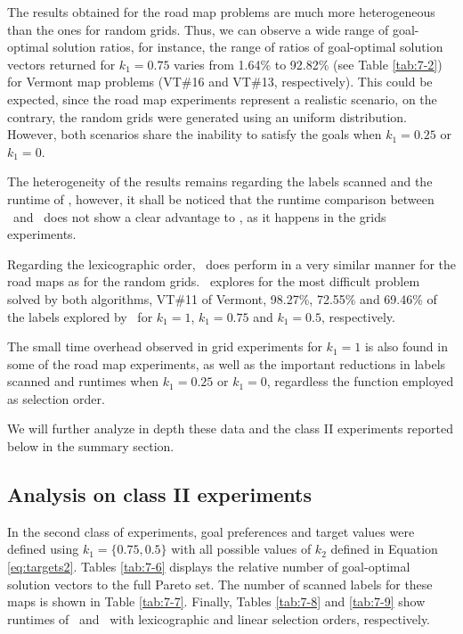 The results obtained for the road map problems are much more heterogeneous than the ones for random grids. Thus, we can observe a wide range of goal-optimal solution ratios, for instance, the range of ratios of goal-optimal solution vectors returned for $k_1 = 0.75$ varies from 1.64\% to 92.82\% (see Table \ref{tab:7-2}) for Vermont map problems (VT\#16 and VT\#13, respectively). This could be expected, since the road map experiments represent a realistic scenario, on the contrary, the random grids were generated using an uniform distribution. However, both scenarios share the inability to satisfy the goals when $k_1 = 0.25$ or $k_1 = 0$.

The heterogeneity of the results remains regarding the labels scanned and the runtime of \lexgo, however, it shall be noticed that the runtime comparison between \namoalex \ and \namoalin \ does not show a clear advantage to \namoalin, as it happens in the grids experiments. 

Regarding the lexicographic order, \lexgo \ does perform in a very similar manner for the road maps as for the random grids. \lexgo \ explores for the most difficult problem solved by both algorithms, VT\#11 of Vermont, 98.27\%, 72.55\% and 69.46\% of the labels explored by \namoa \ for $k_1=1$, $k_1=0.75$ and $k_1=0.5$, respectively. 

The small time overhead observed in grid experiments for $k_1=1$ is also found in some of the road map experiments, as well as the important reductions in labels scanned and runtimes when $k_1 = 0.25$ or $k_1 = 0$, regardless the function employed as selection order.

We will further analyze in depth these data and the class II experiments reported below in the summary section. 

\subsection{Analysis on class II experiments}
\label{chapEmpiricalAnalysis:subsec:analysisdimacslexgoc2}

In the second class of experiments, goal preferences and target values were defined using $k_1 = \{0.75 , 0.5\}$ with all possible values of $k_2$ defined in Equation \ref{eq:targets2}. Tables \ref{tab:7-6} displays the relative number of goal-optimal solution vectors to the full Pareto set. The number of scanned labels for these maps is shown in Table \ref{tab:7-7}. Finally, Tables \ref{tab:7-8} and \ref{tab:7-9} show runtimes of \lexgo \ and \namoa \ with lexicographic and linear selection orders, respectively.

